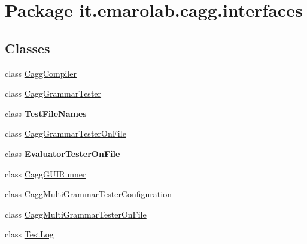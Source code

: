 \hypertarget{namespaceit_1_1emarolab_1_1cagg_1_1interfaces}{\section{Package it.\-emarolab.\-cagg.\-interfaces}
\label{namespaceit_1_1emarolab_1_1cagg_1_1interfaces}
}
\subsection*{Classes}
\begin{DoxyCompactItemize}
\item 
class \hyperlink{classit_1_1emarolab_1_1cagg_1_1interfaces_1_1CaggCompiler}{Cagg\-Compiler}
\item 
class \hyperlink{classit_1_1emarolab_1_1cagg_1_1interfaces_1_1CaggGrammarTester}{Cagg\-Grammar\-Tester}
\item 
class {\bfseries Test\-File\-Names}
\item 
class \hyperlink{classit_1_1emarolab_1_1cagg_1_1interfaces_1_1CaggGrammarTesterOnFile}{Cagg\-Grammar\-Tester\-On\-File}
\item 
class {\bfseries Evaluator\-Tester\-On\-File}
\item 
class \hyperlink{classit_1_1emarolab_1_1cagg_1_1interfaces_1_1CaggGUIRunner}{Cagg\-G\-U\-I\-Runner}
\item 
class \hyperlink{classit_1_1emarolab_1_1cagg_1_1interfaces_1_1CaggMultiGrammarTesterConfiguration}{Cagg\-Multi\-Grammar\-Tester\-Configuration}
\item 
class \hyperlink{classit_1_1emarolab_1_1cagg_1_1interfaces_1_1CaggMultiGrammarTesterOnFile}{Cagg\-Multi\-Grammar\-Tester\-On\-File}
\item 
class \hyperlink{classit_1_1emarolab_1_1cagg_1_1interfaces_1_1TestLog}{Test\-Log}
\end{DoxyCompactItemize}

